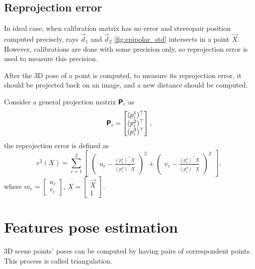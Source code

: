 \subsection{Reprojection error}
In ideal case, when calibration matrix has no error and stereopair position computed precisely, rays $\vec{d}_1$ and $\vec{d}_2$ \autoref{fig:epipolar_std} intersects in a point $\vec{X}$. 
However, calibrations are done with some precision only, so reprojection error is used to measure this precision.

After the 3D pose of a point is computed, to measure its reprojection error, it should be projected back on an image, and a new distance should be computed.

Consider a general projection matrix $\pmb{\mathsf{P}}_i$ as
\begin{equation}
    \label{eq:p_general}
    \pmb{\mathsf{P}}_i = \begin{bmatrix} (p_i^1)^\top \\ (p_i^2)^\top \\ (p_i^3)^\top \end{bmatrix},
\end{equation}
the reprojection error is defined as 
\begin{equation}
    e^2(\underline{X}) = \sum_{c=1}^{2}{  
    \begin{bmatrix}
        \begin{pmatrix}
            u_c - \frac{(p_c^1)^\top \underline{X}}{(p_c^3)^\top \underline{X}}
        \end{pmatrix}^2 + 
        \begin{pmatrix}
            v_c - \frac{(p_c^2)^\top \underline{X}}{(p_c^3)^\top \underline{X}}
        \end{pmatrix}^2
    \end{bmatrix}
    },
\end{equation}
where $m_c = \begin{bmatrix} u_c \\ v_c \end{bmatrix}$, $\underline{X} = \begin{bmatrix} \vec{X} \\ 1 \end{bmatrix}$.

\section{Features pose estimation}

3D scene points' poses can be computed by having pairs of correspondent points.
This process is called triangulation.

